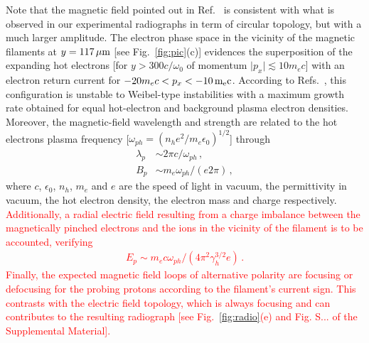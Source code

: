 \documentclass[aps,twocolumn,showpacs,superscriptaddress]{revtex4}
\begin{document}
 Note that the magnetic field  pointed out in Ref.~\cite{PRL_Gode_2017} is consistent with what is observed in our  experimental radiographs in term of circular topology, but with a much larger  amplitude. 
 The electron phase space in the vicinity of the magnetic filaments at $y = 117\,\rm \mu m$ [see Fig.~\ref{fig:pic}(c)] evidences the superposition of the expanding hot electrons [for  $y > 300c/\omega_0$ of momentum $\vert p_x \vert \lesssim 10 m_ec$] with an electron return current for $-20 m_ec < p_x< -10\,\rm m_e c$.
According to Refs.~\cite{POP_Ren_2006, PRL_Gode_2017}, %
this configuration  is unstable to Weibel-type instabilities with a maximum growth rate obtained for equal hot-electron and background plasma electron densities. Moreover, the magnetic-field wavelength and strength are related to the hot electrons plasma frequency [$\omega_{ph}=(n_h e^2/m_e \epsilon_0)^{1/2}$] through 
\begin{align}
 \lambda_p &\sim  2\pi c/\omega_{ph} \label{eq:lp}  \, ,\\
 B_p       &\sim m_e \omega_{ph}/(e2\pi) \label{eq:bp} \, , 
\end{align}
where $c$, $\epsilon_0$, $n_h$, $m_e$ and $e$  are the speed of light in vacuum, the permittivity in vacuum,  the hot electron density, the electron mass and  charge respectively.
\textcolor{red}{
Additionally, a radial electric field resulting from a charge imbalance between the magnetically pinched electrons and the ions in the vicinity of the filament is to be accounted, verifying 
\begin{align}
E_p \sim m_ec\omega_{ph} /(4\pi^2\gamma_h^{3/2} e) \label{eq:ep} \, .
\end{align}
Finally, the expected magnetic field loops of alternative polarity are  focusing or defocusing for the probing protons according to the filament's current sign. This contrasts with the electric field  topology, which is always focusing and  can contributes to  the resulting radiograph [see Fig.~\ref{fig:radio}(e) and Fig. S... of the Supplemental Material].
}
\end{document}
